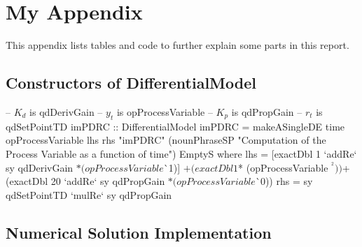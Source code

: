 \chapter{My Appendix}
\label{appendix_a}

This appendix lists tables and code to further explain some parts in this report.

\section{Constructors of DifferentialModel}
\label{const_de}

\begin{haskell1}
-- $K_d$ is qdDerivGain
-- $y_t$ is opProcessVariable
-- $K_p$ is qdPropGain
-- $r_t$ is qdSetPointTD
imPDRC :: DifferentialModel
imPDRC = makeASingleDE
	time
	opProcessVariable
	lhs
	rhs
	"imPDRC"
	(nounPhraseSP "Computation of the Process Variable as a function of time")
	EmptyS
	where 
	lhs = [exactDbl 1 `addRe` sy qdDerivGain $* (opProcessVariable $^^ 1)]
	$+ (exactDbl 1 $* (opProcessVariable $^^ 2))
	$+ (exactDbl 20 `addRe` sy qdPropGain $* (opProcessVariable $^^ 0))
	rhs = sy qdSetPointTD `mulRe` sy qdPropGain
\end{haskell1}


\pagebreak

\section{Numerical Solution Implementation}
\label{numsol}

